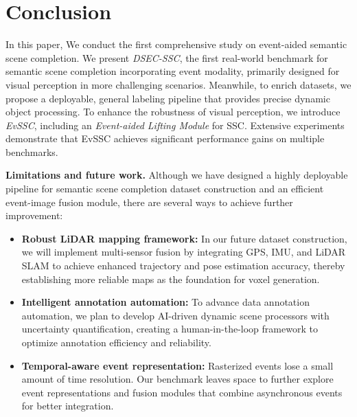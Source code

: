 \section{Conclusion}
\label{sec:conclusion}

In this paper, We conduct the first comprehensive study on event-aided semantic scene completion. 
We present \emph{DSEC-SSC}, the first real-world benchmark for semantic scene completion incorporating event modality, primarily designed for visual perception in more challenging scenarios. 
Meanwhile, to enrich datasets,
%
we propose a deployable, general labeling pipeline that provides precise dynamic object processing. 
To enhance the robustness of visual perception, we introduce \emph{EvSSC}, including an \emph{Event-aided Lifting Module} for SSC. 
Extensive experiments demonstrate that EvSSC achieves significant performance gains on multiple benchmarks.
%

\noindent\textbf{Limitations and future work.} Although we have designed a highly deployable pipeline for semantic scene completion dataset construction and an efficient event-image fusion module, there are several ways to achieve further improvement:
\begin{itemize}
    \item \textbf{Robust LiDAR mapping framework:} In our future dataset construction, we will implement multi-sensor fusion by integrating GPS, IMU, and LiDAR SLAM to achieve enhanced trajectory and pose estimation accuracy, thereby establishing more reliable maps as the foundation for voxel generation.
    \item \textbf{Intelligent annotation automation:} To advance data annotation automation, we plan to develop AI-driven dynamic scene processors with uncertainty quantification, creating a human-in-the-loop framework to optimize annotation efficiency and reliability.
    \item \textbf{Temporal-aware event representation:} Rasterized events lose a small amount of time resolution. Our benchmark leaves space to further explore event representations and fusion modules that combine asynchronous events for better integration.
\end{itemize}
